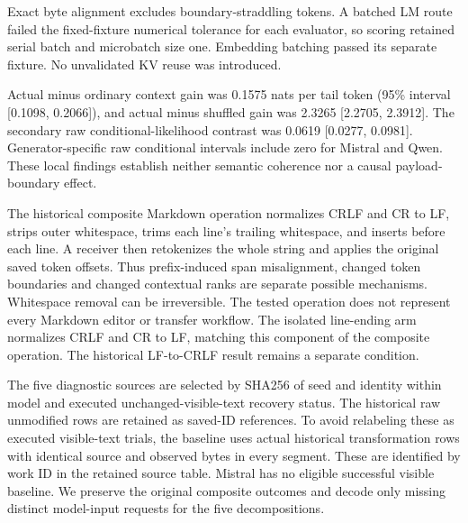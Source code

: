 Exact byte alignment excludes boundary-straddling tokens. A batched LM route failed the fixed-fixture numerical tolerance for each evaluator, so scoring retained serial batch and microbatch size one. Embedding batching passed its separate fixture. No unvalidated KV reuse was introduced.

Actual minus ordinary context gain was 0.1575 nats per tail token (95\% interval [0.1098, 0.2066]), and actual minus shuffled gain was 2.3265 [2.2705, 2.3912]. The secondary raw conditional-likelihood contrast was 0.0619 [0.0277, 0.0981]. Generator-specific raw conditional intervals include zero for Mistral and Qwen. These local findings establish neither semantic coherence nor a causal payload-boundary effect.




\label{si:v4-transport}
The historical composite Markdown operation normalizes CRLF and CR to LF, strips outer whitespace, trims each line's trailing whitespace, and inserts \code{> } before each line. A receiver then retokenizes the whole string and applies the original saved token offsets. Thus prefix-induced span misalignment, changed token boundaries and changed contextual ranks are separate possible mechanisms. Whitespace removal can be irreversible. The tested operation does not represent every Markdown editor or transfer workflow. The isolated line-ending arm normalizes CRLF and CR to LF, matching this component of the composite operation. The historical LF-to-CRLF result remains a separate condition.

The five diagnostic sources are selected by SHA256 of seed and identity within model and executed unchanged-visible-text recovery status. The historical raw unmodified rows are retained as saved-ID references. To avoid relabeling these as executed visible-text trials, the baseline uses actual historical transformation rows with identical source and observed bytes in every segment. These are identified by work ID in the retained source table. Mistral has no eligible successful visible baseline. We preserve the original composite outcomes and decode only missing distinct model-input requests for the five decompositions.


